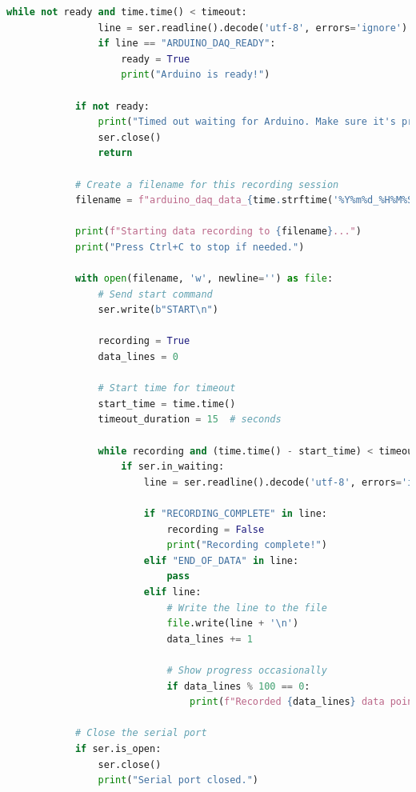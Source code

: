 \begin{lstlisting}[style=pythonstyle, caption=Python Serial Receive Script, label=lst:pythonCodeApp, language=Python ]
            while not ready and time.time() < timeout:
                line = ser.readline().decode('utf-8', errors='ignore').strip()
                if line == "ARDUINO_DAQ_READY":
                    ready = True
                    print("Arduino is ready!")
            
            if not ready:
                print("Timed out waiting for Arduino. Make sure it's properly connected.")
                ser.close()
                return
            
            # Create a filename for this recording session
            filename = f"arduino_daq_data_{time.strftime('%Y%m%d_%H%M%S')}.csv"
            
            print(f"Starting data recording to {filename}...")
            print("Press Ctrl+C to stop if needed.")
            
            with open(filename, 'w', newline='') as file:
                # Send start command
                ser.write(b"START\n")
                
                recording = True
                data_lines = 0
                
                # Start time for timeout
                start_time = time.time()
                timeout_duration = 15  # seconds
                
                while recording and (time.time() - start_time) < timeout_duration:
                    if ser.in_waiting:
                        line = ser.readline().decode('utf-8', errors='ignore').strip()
                        
                        if "RECORDING_COMPLETE" in line:
                            recording = False
                            print("Recording complete!")
                        elif "END_OF_DATA" in line:
                            pass
                        elif line:
                            # Write the line to the file
                            file.write(line + '\n')
                            data_lines += 1
                            
                            # Show progress occasionally
                            if data_lines % 100 == 0:
                                print(f"Recorded {data_lines} data points...")
            
            # Close the serial port
            if ser.is_open:
                ser.close()
                print("Serial port closed.")
            

\end{lstlisting}
